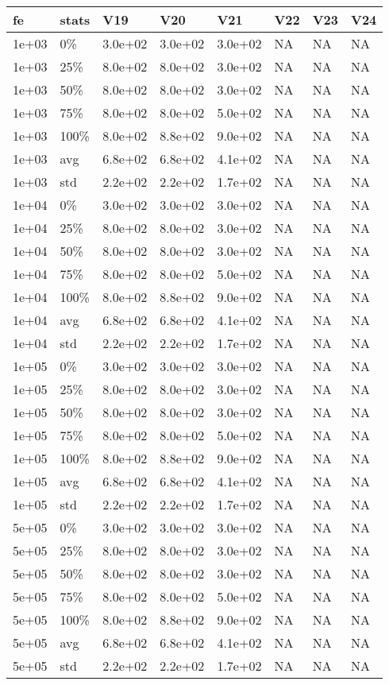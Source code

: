 \begin{longtable}{llllllll}
  \hline
fe & stats & V19 & V20 & V21 & V22 & V23 & V24 \\ 
  \hline
1e+03 & 0\% & 3.0e+02 & 3.0e+02 & 3.0e+02 & NA & NA & NA \\ 
  1e+03 & 25\% & 8.0e+02 & 8.0e+02 & 3.0e+02 & NA & NA & NA \\ 
  1e+03 & 50\% & 8.0e+02 & 8.0e+02 & 3.0e+02 & NA & NA & NA \\ 
  1e+03 & 75\% & 8.0e+02 & 8.0e+02 & 5.0e+02 & NA & NA & NA \\ 
  1e+03 & 100\% & 8.0e+02 & 8.8e+02 & 9.0e+02 & NA & NA & NA \\ 
  1e+03 & avg & 6.8e+02 & 6.8e+02 & 4.1e+02 & NA & NA & NA \\ 
  1e+03 & std & 2.2e+02 & 2.2e+02 & 1.7e+02 & NA & NA & NA \\ 
  1e+04 & 0\% & 3.0e+02 & 3.0e+02 & 3.0e+02 & NA & NA & NA \\ 
  1e+04 & 25\% & 8.0e+02 & 8.0e+02 & 3.0e+02 & NA & NA & NA \\ 
  1e+04 & 50\% & 8.0e+02 & 8.0e+02 & 3.0e+02 & NA & NA & NA \\ 
  1e+04 & 75\% & 8.0e+02 & 8.0e+02 & 5.0e+02 & NA & NA & NA \\ 
  1e+04 & 100\% & 8.0e+02 & 8.8e+02 & 9.0e+02 & NA & NA & NA \\ 
  1e+04 & avg & 6.8e+02 & 6.8e+02 & 4.1e+02 & NA & NA & NA \\ 
  1e+04 & std & 2.2e+02 & 2.2e+02 & 1.7e+02 & NA & NA & NA \\ 
  1e+05 & 0\% & 3.0e+02 & 3.0e+02 & 3.0e+02 & NA & NA & NA \\ 
  1e+05 & 25\% & 8.0e+02 & 8.0e+02 & 3.0e+02 & NA & NA & NA \\ 
  1e+05 & 50\% & 8.0e+02 & 8.0e+02 & 3.0e+02 & NA & NA & NA \\ 
  1e+05 & 75\% & 8.0e+02 & 8.0e+02 & 5.0e+02 & NA & NA & NA \\ 
  1e+05 & 100\% & 8.0e+02 & 8.8e+02 & 9.0e+02 & NA & NA & NA \\ 
  1e+05 & avg & 6.8e+02 & 6.8e+02 & 4.1e+02 & NA & NA & NA \\ 
  1e+05 & std & 2.2e+02 & 2.2e+02 & 1.7e+02 & NA & NA & NA \\ 
  5e+05 & 0\% & 3.0e+02 & 3.0e+02 & 3.0e+02 & NA & NA & NA \\ 
  5e+05 & 25\% & 8.0e+02 & 8.0e+02 & 3.0e+02 & NA & NA & NA \\ 
  5e+05 & 50\% & 8.0e+02 & 8.0e+02 & 3.0e+02 & NA & NA & NA \\ 
  5e+05 & 75\% & 8.0e+02 & 8.0e+02 & 5.0e+02 & NA & NA & NA \\ 
  5e+05 & 100\% & 8.0e+02 & 8.8e+02 & 9.0e+02 & NA & NA & NA \\ 
  5e+05 & avg & 6.8e+02 & 6.8e+02 & 4.1e+02 & NA & NA & NA \\ 
  5e+05 & std & 2.2e+02 & 2.2e+02 & 1.7e+02 & NA & NA & NA \\ 
   \hline
\hline
\end{longtable}
